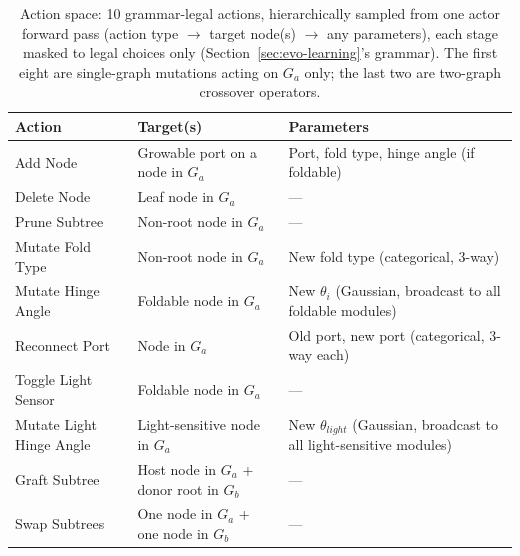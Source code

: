 \documentclass[12pt,a4paper]{report}
\begin{document}
\begin{table}[htbp]
\centering
\footnotesize
\caption{Action space: 10 grammar-legal actions, hierarchically sampled from one actor forward pass (action type $\rightarrow$ target node(s) $\rightarrow$ any parameters), each stage masked to legal choices only (Section~\ref{sec:evo-learning}'s grammar). The first eight are single-graph mutations acting on $G_a$ only; the last two are two-graph crossover operators.}
\label{tab:action-space-appendix}
\begin{tabular}{@{}p{3.6cm}p{4.6cm}p{5.6cm}@{}}
\toprule
\textbf{Action} & \textbf{Target(s)} & \textbf{Parameters} \\
\midrule
Add Node & Growable port on a node in $G_a$ & Port, fold type, hinge angle (if foldable) \\
Delete Node & Leaf node in $G_a$ & --- \\
Prune Subtree & Non-root node in $G_a$ & --- \\
Mutate Fold Type & Non-root node in $G_a$ & New fold type (categorical, 3-way) \\
Mutate Hinge Angle & Foldable node in $G_a$ & New $\theta_i$ (Gaussian, broadcast to all foldable modules) \\
Reconnect Port & Node in $G_a$ & Old port, new port (categorical, 3-way each) \\
Toggle Light Sensor & Foldable node in $G_a$ & --- \\
Mutate Light Hinge Angle & Light-sensitive node in $G_a$ & New $\theta_{light}$ (Gaussian, broadcast to all light-sensitive modules) \\
Graft Subtree & Host node in $G_a$ + donor root in $G_b$ & --- \\
Swap Subtrees & One node in $G_a$ + one node in $G_b$ & --- \\
\bottomrule
\end{tabular}
\end{table}
\end{document}
